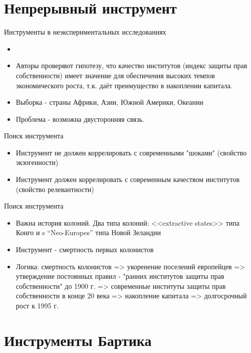 \section{Непрерывный инструмент}

\begin{frame}{Инструменты в неэкспериментальных исследованиях}


  \begin{itemize}
      \item {}
      \item Авторы проверяют гипотезу, что качество институтов (индекс защиты прав собственности) имеет значение для обеспечения высоких темпов экономического роста, т.к. даёт преимущество в накоплении капитала.
      \item Выборка - страны Африки, Азии, Южной Америки, Океании
      \item Проблема - возможна двусторонняя связь.
  \end{itemize}
\end{frame}

\begin{frame}{Поиск инструмента}
  \begin{itemize}
      \item Инструмент не должен коррелировать с современными "шоками" (свойство экзогенности)
      \item Инструмент должен коррелировать с современным качеством институтов (свойство релевантности)
       
 \end{itemize}
\end{frame}

\begin{frame}{Поиск инструмента}
  \begin{itemize}
    \item Важна история колоний. Два типа колоний: <<extractive states>> типа Конго и s “Neo-Europes” типа Новой Зеландии
      \item Инструмент - смертность первых колонистов
      \item Логика: смертность колонистов => укоренение поселений европейцев => утверждение постоянных правил - "ранних институтов защиты прав собственности" до 1900 г. => современные институты защиты прав собственности в конце 20 века => накопление капитала => долгосрочный рост к 1995 г. 
 \end{itemize}
\end{frame}

\section{Инструменты Бартика}


